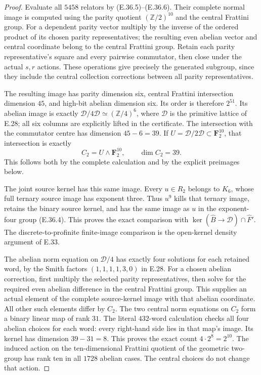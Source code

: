 \begin{proof}
Evaluate all $5458$ relators by
\textup{(E.36.5)--(E.36.6)}.  Their complete
normal image is computed using the parity quotient
$(\mathbb Z/2)^{10}$ and the central Frattini group.
For a dependent parity vector multiply by the
inverse of the ordered product of its chosen
parity representatives; the resulting even
abelian vector and central coordinate belong to
the central Frattini group.  Retain each parity
representative's square and every pairwise
commutator, then close under the actual $s,r$
actions.  These operations give precisely the
generated subgroup, since they include the
central collection corrections between all
parity representatives.

The resulting image has parity dimension six,
central Frattini intersection dimension $45$,
and high-bit abelian dimension six.  Its order
is therefore $2^{51}$.  Its abelian image is
exactly $\mathcal D/4\mathcal D\simeq(\mathbb Z/4)^6$,
where $\mathcal D$ is the primitive lattice of
E.28; all six columns are explicitly lifted in
the certificate.  The intersection with the
commutator centre has dimension $45-6=39$.
If $U=\mathcal D/2\mathcal D\subset\mathbf F_2^{10}$,
that intersection is exactly
\[
             C_2=U\wedge\mathbf F_2^{10},
                    \qquad\dim C_2=39 .
 \tag{E.36.8}
\]
This follows both by the complete calculation
and by the explicit preimages below.

The joint source kernel has this same image.
Every $u\in R_2$ belongs to $K_6$, whose full
ternary source image has exponent three.
Thus $u^9$ kills that ternary image, retains
the binary source kernel, and has the same
image as $u$ in the exponent-four group
\textup{(E.36.4)}.  This proves the exact
comparison with
$\ker(\widehat B\to\mathscr D)\cap\widehat F'$.
The discrete-to-profinite finite-image comparison
is the open-kernel density argument of E.33.

The abelian norm equation on $\mathcal D/4$
has exactly four solutions for each retained
word, by the Smith factors
$(1,1,1,1,3,0)$ in E.28.  For a chosen abelian
correction, first multiply the selected parity
representatives, then solve for the required
even abelian difference in the central Frattini
group.  This supplies an actual element of the
complete source-kernel image with that abelian
coordinate.  All other such elements differ by
$C_2$.  The two central norm equations on
$C_2$ form a binary linear map of rank $31$.
The literal $432$-word calculation checks all
four abelian choices for each word: every
right-hand side lies in that map's image.
Its kernel has dimension $39-31=8$.
This proves the exact count $4\cdot2^8=2^{10}$.
The induced action on the ten-dimensional
Frattini quotient of the geometric two-group
has rank ten in all $1728$ abelian cases.
The central choices do not change that action.


\end{proof}
